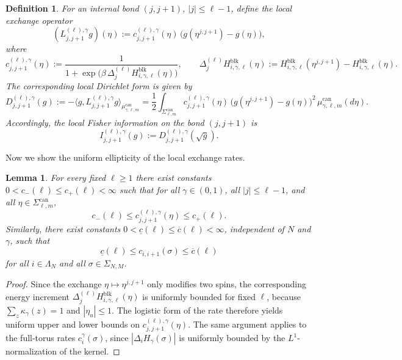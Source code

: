 \documentclass{article}
\newtheorem{lemma}{Lemma}
\newtheorem{definition}{Definition}[section]
\begin{document}
\begin{definition}\label{def:local-dirichlet}
For an internal bond \((j,j+1)\), \(|j|\le \ell-1\), define the local exchange operator
\[
(L_{j,j+1}^{(\ell),\gamma}g)(\eta)
:=
c_{j,j+1}^{(\ell),\gamma}(\eta)\,
\bigl(g(\eta^{j,j+1})-g(\eta)\bigr),
\]
where
\[
c_{j,j+1}^{(\ell),\gamma}(\eta)
:=
\frac{1}{1+\exp\!\bigl(\beta\,\Delta_{j}^{(\ell)}H_{i,\gamma,\ell}^{\mathrm{blk}}(\eta)\bigr)},
\qquad
\Delta_{j}^{(\ell)}H_{i,\gamma,\ell}^{\mathrm{blk}}(\eta)
:=
H_{i,\gamma,\ell}^{\mathrm{blk}}(\eta^{j,j+1})-H_{i,\gamma,\ell}^{\mathrm{blk}}(\eta).
\]
The corresponding local Dirichlet form is given by
\[
D_{j,j+1}^{(\ell),\gamma}(g)
:=
-\bigl\langle g,L_{j,j+1}^{(\ell),\gamma}g\bigr\rangle_{\mu_{\gamma,\ell,m}^{\mathrm{can}}}
=
\frac12 \int_{\Sigma_{\ell,m}^{\mathrm{can}}}
c_{j,j+1}^{(\ell),\gamma}(\eta)\,
\bigl(g(\eta^{j,j+1})-g(\eta)\bigr)^2\, \mu_{\gamma,\ell,m}^{\mathrm{can}}(d\eta).
\]
Accordingly, the local Fisher information on the bond \((j,j+1)\) is
\begin{equation}\label{def:localF}
    I_{j,j+1}^{(\ell),\gamma}(g) := D_{j,j+1}^{(\ell),\gamma}(\sqrt g).
\end{equation}
\end{definition}

Now we show the uniform ellipticity of the local exchange rates.

\begin{lemma}\label{lem:local-rates-elliptic}
For every fixed \(\ell\ge1\) there exist constants
\(
0<c_-(\ell)\le c_+(\ell)<\infty
\)
such that for all \(\gamma\in(0,1)\), all \(|j|\le \ell-1\), and all \(\eta\in\Sigma_{\ell,m}^{\mathrm{can}}\),
\[
c_-(\ell)\le c_{j,j+1}^{(\ell),\gamma}(\eta)\le c_+(\ell).
\]
Similarly, there exist constants \(0<\underline c (\ell) \le \overline c (\ell) <\infty\), independent of \(N\) and \(\gamma\), such that
\[
\underline c (\ell) \le c_{i,i+1}(\sigma)\le \overline c(\ell)
\]
for all \(i\in\Lambda_N\) and all \(\sigma\in\Sigma_{N,M}\).
\end{lemma}

\begin{proof}
Since the exchange \(\eta\mapsto\eta^{j,j+1}\) only modifies two spins, the corresponding energy increment
\(
\Delta_j^{(\ell)}H_{i,\gamma,\ell}^{\mathrm{blk}}(\eta)
\)
is uniformly bounded for fixed \(\ell\), because \(\sum_{z}\kappa_\gamma(z)=1\) and \(|\eta_u|\le1\). The logistic form of the rate therefore yields uniform upper and lower bounds on \(c_{j,j+1}^{(\ell),\gamma}(\eta)\). The same argument applies to the full-torus rates \(c_i^\gamma(\sigma)\), since \(|\Delta_i H_\gamma(\sigma)|\) is uniformly bounded by the \(L^1\)-normalization of the kernel.
\end{proof}
\end{document}
